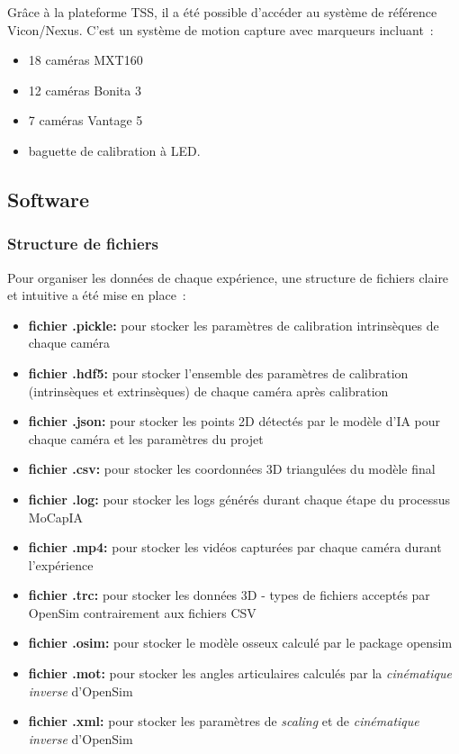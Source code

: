         Grâce à la plateforme TSS, il a été possible d'accéder au système de référence Vicon/Nexus. C'est un système de motion capture avec marqueurs incluant :
        \begin{itemize}
            \item 18 caméras MXT160
            \item 12 caméras Bonita 3
            \item 7 caméras Vantage 5
            \item baguette de calibration à LED.

        \end{itemize}

        \subsection{Software}
            \subsubsection{Structure de fichiers}
            Pour organiser les données de chaque expérience, une structure de fichiers claire et intuitive a été mise en place :
            \begin{itemize}
                \item \textbf{fichier .pickle:} pour stocker les paramètres de calibration intrinsèques de chaque caméra
                \item \textbf{fichier .hdf5:} pour stocker l'ensemble des paramètres de calibration (intrinsèques et extrinsèques) de chaque caméra après calibration
                \item \textbf{fichier .json:} pour stocker les points 2D détectés par le modèle d'IA pour chaque caméra et les paramètres du projet
                \item \textbf{fichier .csv:} pour stocker les coordonnées 3D triangulées du modèle final
                \item \textbf{fichier .log:} pour stocker les logs générés durant chaque étape du processus MoCapIA
                \item \textbf{fichier .mp4:} pour stocker les vidéos capturées par chaque caméra durant l'expérience
                \item \textbf{fichier .trc:} pour stocker les données 3D - types de fichiers acceptés par OpenSim contrairement aux fichiers CSV
                \item \textbf{fichier .osim:} pour stocker le modèle osseux calculé par le package opensim
                \item \textbf{fichier .mot:} pour stocker les angles articulaires calculés par la \textit{cinématique inverse} d'OpenSim
                \item \textbf{fichier .xml:} pour stocker les paramètres de \textit{scaling} et de \textit{cinématique inverse} d'OpenSim
            \end{itemize}


